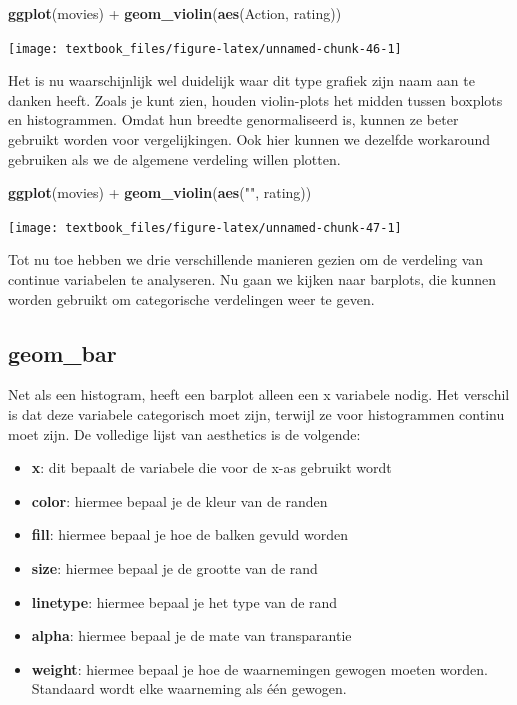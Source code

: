 \documentclass[]{tufte-book}
\newenvironment{Shaded}{}{}
\newcommand{\KeywordTok}[1]{\textcolor[rgb]{0.00,0.44,0.13}{\textbf{#1}}}
\newcommand{\NormalTok}[1]{#1}
\newcommand{\OperatorTok}[1]{\textcolor[rgb]{0.40,0.40,0.40}{#1}}
\newcommand{\StringTok}[1]{\textcolor[rgb]{0.25,0.44,0.63}{#1}}
\providecommand{\tightlist}{%
  \setlength{\itemsep}{0pt}\setlength{\parskip}{0pt}}
\begin{document}
\begin{Shaded}
\begin{Highlighting}[]
\KeywordTok{ggplot}\NormalTok{(movies) }\OperatorTok{+}\StringTok{ }
\StringTok{    }\KeywordTok{geom_violin}\NormalTok{(}\KeywordTok{aes}\NormalTok{(Action, rating))}
\end{Highlighting}
\end{Shaded}

\texttt{[image: textbook\_files/figure-latex/unnamed-chunk-46-1]}

Het is nu waarschijnlijk wel duidelijk waar dit type grafiek zijn naam aan te danken heeft. Zoals je kunt zien, houden violin-plots het midden tussen boxplots en histogrammen. Omdat hun breedte genormaliseerd is, kunnen ze beter gebruikt worden voor vergelijkingen. Ook hier kunnen we dezelfde workaround gebruiken als we de algemene verdeling willen plotten.

\begin{Shaded}
\begin{Highlighting}[]
\KeywordTok{ggplot}\NormalTok{(movies) }\OperatorTok{+}
\StringTok{    }\KeywordTok{geom_violin}\NormalTok{(}\KeywordTok{aes}\NormalTok{(}\StringTok{""}\NormalTok{, rating))}
\end{Highlighting}
\end{Shaded}

\texttt{[image: textbook\_files/figure-latex/unnamed-chunk-47-1]}

Tot nu toe hebben we drie verschillende manieren gezien om de verdeling van continue variabelen te analyseren. Nu gaan we kijken naar barplots, die kunnen worden gebruikt om categorische verdelingen weer te geven.

\hypertarget{geom_bar}{%
\subsection{geom\_bar}\label{geom_bar}}

Net als een histogram, heeft een barplot alleen een x variabele nodig. Het verschil is dat deze variabele categorisch moet zijn, terwijl ze voor histogrammen continu moet zijn. De volledige lijst van aesthetics is de volgende:

\begin{itemize}
\tightlist
\item
  \textbf{x}: dit bepaalt de variabele die voor de x-as gebruikt wordt
\item
  \textbf{color}: hiermee bepaal je de kleur van de randen
\item
  \textbf{fill}: hiermee bepaal je hoe de balken gevuld worden
\item
  \textbf{size}: hiermee bepaal je de grootte van de rand
\item
  \textbf{linetype}: hiermee bepaal je het type van de rand
\item
  \textbf{alpha}: hiermee bepaal je de mate van transparantie
\item
  \textbf{weight}: hiermee bepaal je hoe de waarnemingen gewogen moeten worden. Standaard wordt elke waarneming als één gewogen.
\end{itemize}
\end{document}
